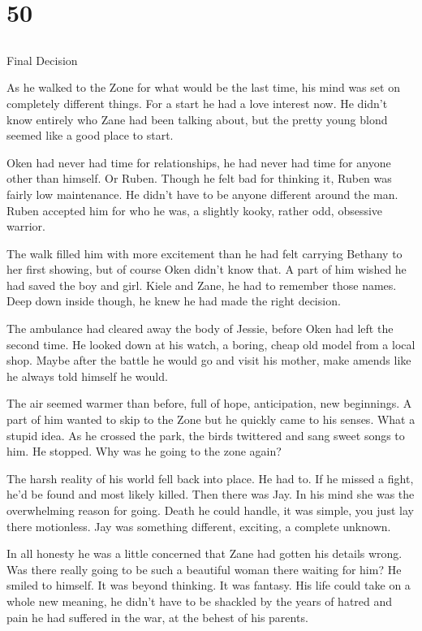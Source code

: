 \chapter{50}
\section{}
Final Decision  

As he walked to the Zone for what would be the last time, his mind was set on completely different things.  For a start he had a love interest now.  He didn't know entirely who Zane had been talking about, but the pretty young blond seemed like a good place to start.  

Oken had never had time for relationships, he had never had time for anyone other than himself.  Or Ruben.  Though he felt bad for thinking it, Ruben was fairly low maintenance.  He didn't have to be anyone different around the man.  Ruben accepted him for who he was, a slightly kooky, rather odd, obsessive warrior.

The walk filled him with more excitement than he had felt carrying Bethany to her first showing, but of course Oken didn't know that.  A part of him wished he had saved the boy and girl.  Kiele and Zane, he had to remember those names.  Deep down inside though, he knew he had made the right decision.  

The ambulance had cleared away the body of Jessie, before Oken had left the second time.  He looked down at his watch, a boring, cheap old model from a local shop.  Maybe after the battle he would go and visit his mother, make amends like he always told himself he would.

The air seemed warmer than before, full of hope, anticipation, new beginnings.  A part of him wanted to skip to the Zone but he quickly came to his senses.  What a stupid idea.  As he crossed the park, the birds twittered and sang sweet songs to him.  He stopped.  Why was he going to the zone again?

The harsh reality of his world fell back into place.  He had to.  If he missed a fight, he'd be found and most likely killed.  Then there was Jay.  In his mind she was the overwhelming reason for going.  Death he could handle, it was simple, you just lay there motionless.  Jay was something different, exciting, a complete unknown.  

In all honesty he was a little concerned that Zane had gotten his details wrong.  Was there really going to be such a beautiful woman there waiting for him?  He smiled to himself.  It was beyond thinking.  It was fantasy.  His life could take on a whole new meaning, he didn't have to be shackled by the years of hatred and pain he had suffered in the war, at the behest of his parents.  

